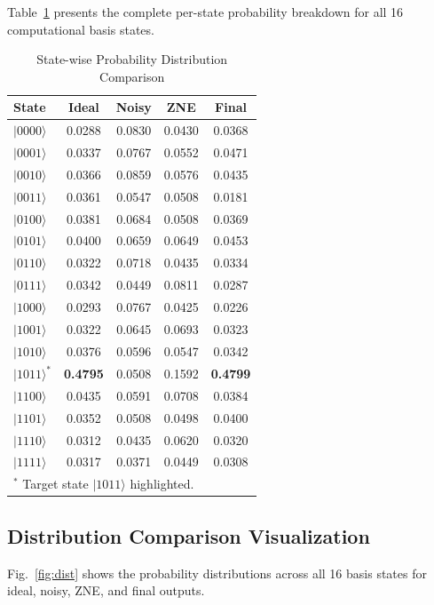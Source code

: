 \documentclass[journal]{IEEEtran}
\begin{document}
Table~\ref{tab:statewise} presents the complete per-state probability breakdown for all 16 computational basis states.

\begin{table}[ht]
\caption{State-wise Probability Distribution Comparison}
\label{tab:statewise}
\centering
\begin{tabular}{lcccc}
\toprule
\textbf{State} & \textbf{Ideal} & \textbf{Noisy} & \textbf{ZNE} & \textbf{Final} \\
\midrule
$|0000\rangle$ & 0.0288 & 0.0830 & 0.0430 & 0.0368 \\
$|0001\rangle$ & 0.0337 & 0.0767 & 0.0552 & 0.0471 \\
$|0010\rangle$ & 0.0366 & 0.0859 & 0.0576 & 0.0435 \\
$|0011\rangle$ & 0.0361 & 0.0547 & 0.0508 & 0.0181 \\
$|0100\rangle$ & 0.0381 & 0.0684 & 0.0508 & 0.0369 \\
$|0101\rangle$ & 0.0400 & 0.0659 & 0.0649 & 0.0453 \\
$|0110\rangle$ & 0.0322 & 0.0718 & 0.0435 & 0.0334 \\
$|0111\rangle$ & 0.0342 & 0.0449 & 0.0811 & 0.0287 \\
$|1000\rangle$ & 0.0293 & 0.0767 & 0.0425 & 0.0226 \\
$|1001\rangle$ & 0.0322 & 0.0645 & 0.0693 & 0.0323 \\
$|1010\rangle$ & 0.0376 & 0.0596 & 0.0547 & 0.0342 \\
$|1011\rangle^*$ & \textbf{0.4795} & 0.0508 & 0.1592 & \textbf{0.4799} \\
$|1100\rangle$ & 0.0435 & 0.0591 & 0.0708 & 0.0384 \\
$|1101\rangle$ & 0.0352 & 0.0508 & 0.0498 & 0.0400 \\
$|1110\rangle$ & 0.0312 & 0.0435 & 0.0620 & 0.0320 \\
$|1111\rangle$ & 0.0317 & 0.0371 & 0.0449 & 0.0308 \\
\bottomrule
\multicolumn{5}{l}{$^*$ Target state $|1011\rangle$ highlighted.}
\end{tabular}
\end{table}

\subsection{Distribution Comparison Visualization}

Fig.~\ref{fig:dist} shows the probability distributions across all 16 basis states for ideal, noisy, ZNE, and final outputs.
\end{document}

